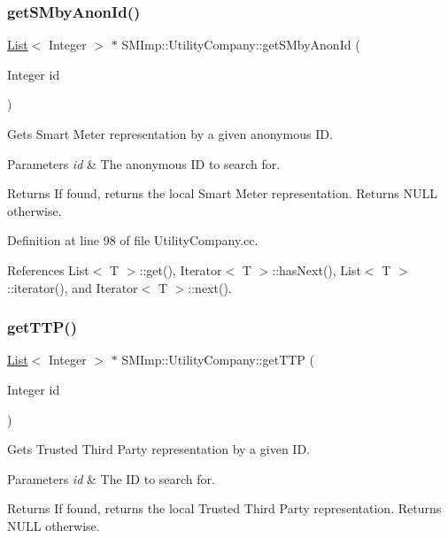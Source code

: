 \subsubsection{\texorpdfstring{get\+S\+Mby\+Anon\+Id()}{getSMbyAnonId()}}
{\footnotesize\ttfamily \hyperlink{classList}{List}$<$ Integer $>$ $\ast$ S\+M\+Imp\+::\+Utility\+Company\+::get\+S\+Mby\+Anon\+Id (\begin{DoxyParamCaption}\item[{Integer}]{id }\end{DoxyParamCaption})}

Gets Smart Meter representation by a given anonymous ID. 
\begin{DoxyParams}{Parameters}
{\em id} & The anonymous ID to search for. \\
\hline
\end{DoxyParams}
\begin{DoxyReturn}{Returns}
If found, returns the local Smart Meter representation. Returns N\+U\+LL otherwise. 
\end{DoxyReturn}


Definition at line 98 of file Utility\+Company.\+cc.



References List$<$ T $>$\+::get(), Iterator$<$ T $>$\+::has\+Next(), List$<$ T $>$\+::iterator(), and Iterator$<$ T $>$\+::next().

\mbox{\label{classSMImp_1_1UtilityCompany_a3e0d30043e9d880b8f8447232af914c2}} 
\subsubsection{\texorpdfstring{get\+T\+T\+P()}{getTTP()}}
{\footnotesize\ttfamily \hyperlink{classList}{List}$<$ Integer $>$ $\ast$ S\+M\+Imp\+::\+Utility\+Company\+::get\+T\+TP (\begin{DoxyParamCaption}\item[{Integer}]{id }\end{DoxyParamCaption})}

Gets Trusted Third Party representation by a given ID. 
\begin{DoxyParams}{Parameters}
{\em id} & The ID to search for. \\
\hline
\end{DoxyParams}
\begin{DoxyReturn}{Returns}
If found, returns the local Trusted Third Party representation. Returns N\+U\+LL otherwise. 
\end{DoxyReturn}


